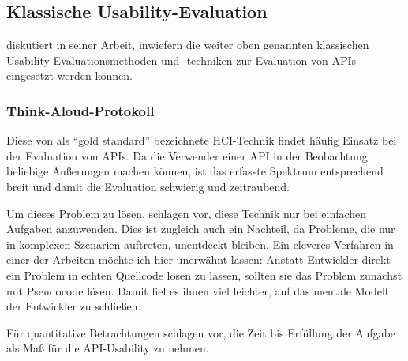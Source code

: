 \subsection{Klassische Usability-Evaluation}

\cite{Beaton:2008ix} diskutiert in seiner Arbeit, inwiefern die weiter oben genannten klassischen Usability-Evaluationsmethoden und -techniken zur Evaluation von APIs eingesetzt werden können.

\subsubsection{Think-Aloud-Protokoll}

Diese von \cite{Beaton:2008ix} als ``gold standard'' bezeichnete HCI-Technik findet häufig Einsatz bei der Evaluation von APIs. Da die Verwender einer API in der Beobachtung beliebige Äußerungen machen können, ist das erfasste Spektrum entsprechend breit und damit die Evaluation schwierig und zeitraubend.

Um dieses Problem zu lösen, schlagen \cite{Stylos:2007jb,Ellis:2007kv} vor, diese Technik nur bei einfachen Aufgaben anzuwenden. Dies ist zugleich auch ein Nachteil, da Probleme, die nur in komplexen Szenarien auftreten, unentdeckt bleiben. Ein cleveres Verfahren in einer der Arbeiten \citep{Ellis:2007kv} möchte ich hier unerwähnt lassen: Anstatt Entwickler direkt ein Problem in echten Quellcode lösen zu lassen, sollten sie das Problem zunächst mit Pseudocode lösen. Damit fiel es ihnen viel leichter, auf das mentale Modell der Entwickler zu schließen.

Für quantitative Betrachtungen schlagen \cite{Ellis:2007kv,Beaton:2008ix} vor, die Zeit bis Erfüllung der Aufgabe als Maß für die API-Usability zu nehmen.


